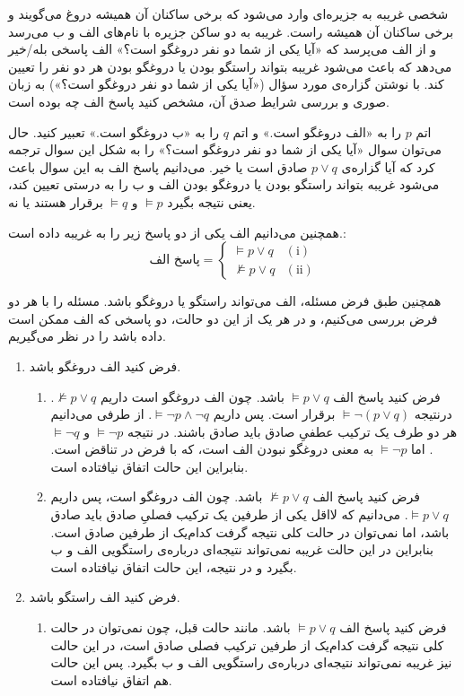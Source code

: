 شخصی غریبه به جزیره‌ای وارد می‌شود که برخی ساکنان آن همیشه دروغ می‌گویند و برخی ساکنان آن همیشه راست. غریبه به دو ساکن جزیره با نام‌های الف و ب می‌رسد و از الف می‌پرسد که «آیا یکی از شما دو نفر دروغگو است؟» الف پاسخی بله/خیر می‌دهد که باعث می‌شود غریبه بتواند راستگو بودن یا دروغگو بودن هر دو نفر را تعیین کند. با نوشتن گزاره‌ی مورد سؤال («آیا یکی از شما دو نفر دروغگو است؟») به زبان صوری و بررسی شرایط صدق آن، مشخص کنید پاسخ الف چه بوده است.
\begin{ans}
  اتم‌
  $p$
  را به «الف دروغگو است.» و اتم
  $q$
  را به «ب دروغگو است.» تعبیر کنید. حال می‌توان سوال «آیا یکی از شما دو نفر دروغگو است؟» را به شکل این سوال ترجمه کرد که آیا گزاره‌ی $p \vee q$ صادق است یا خیر. می‌دانیم پاسخ الف به این سوال باعث می‌شود غریبه بتواند راستگو بودن یا دروغگو بودن الف و ب را به درستی تعیین کند، یعنی نتیجه بگیرد
  $\vDash p$
  و
  $\vDash q$
  برقرار هستند یا نه.
  
  همچنین می‌دانیم الف یکی از دو پاسخ زیر را به غریبه داده است.:
  \[ \text{پاسخ الف} =
    \begin{cases}
      \vDash p \vee q & (\text{i}) \\
      \not \vDash p \vee q & (\text{ii})
    \end{cases}
  \]

همچنین طبق فرض مسئله، الف می‌تواند راستگو یا دروغگو باشد. مسئله را با هر دو فرض بررسی می‌کنیم، و در هر یک از این دو حالت، دو پاسخی که الف ممکن است داده باشد را در نظر می‌گیریم.
  \begin{enumerate}
    \item فرض کنید الف دروغگو باشد.
    \begin{enumerate}
      \item فرض کنید پاسخ الف $\vDash p \vee q$
      باشد. چون الف دروغگو است داریم
      $\not \vDash p \vee q$.
      درنتیجه
      $\vDash \neg (p \vee q)$
      برقرار است. پس داریم
      $\vDash \neg p \wedge \neg q$.
      از طرفی می‌دانیم هر دو طرف یک ترکیب عطفیِ صادق باید صادق باشند. در نتیجه
      $\vDash \neg p$
      و
      $\vDash \neg q$.
      اما
      $\vDash \neg p$
      به معنی دروغگو نبودن الف است، که با فرض در تناقض است. بنابراین این حالت اتفاق نیافتاده است.
      
      \item فرض کنید پاسخ الف $\not \vDash p \vee q$
      باشد. چون الف دروغگو است، پس داریم
      $\vDash p \vee q$.
      می‌دانیم که لااقل یکی از طرفین یک ترکیب فصلیِ صادق باید صادق باشد، اما نمی‌توان در حالت کلی نتیجه گرفت کدام‌یک از طرفین صادق است. بنابراین در این حالت غریبه نمی‌تواند نتیجه‌ای درباره‌ی راستگویی الف و ب بگیرد و در نتیجه، این حالت اتفاق نیافتاده است.
    \end{enumerate}
    \item فرض کنید الف راستگو باشد.
    \begin{enumerate}
      \item فرض کنید پاسخ الف $\vDash p \vee q$
      باشد. مانند حالت قبل، چون نمی‌توان در حالت کلی نتیجه گرفت کدام‌یک از طرفین ترکیب فصلی صادق است، در این حالت نیز غریبه نمی‌تواند نتیجه‌ای درباره‌ی راستگویی الف و ب بگیرد. پس این حالت هم اتفاق نیافتاده است.


\end{enumerate}
\end{enumerate}
\end{ans}
